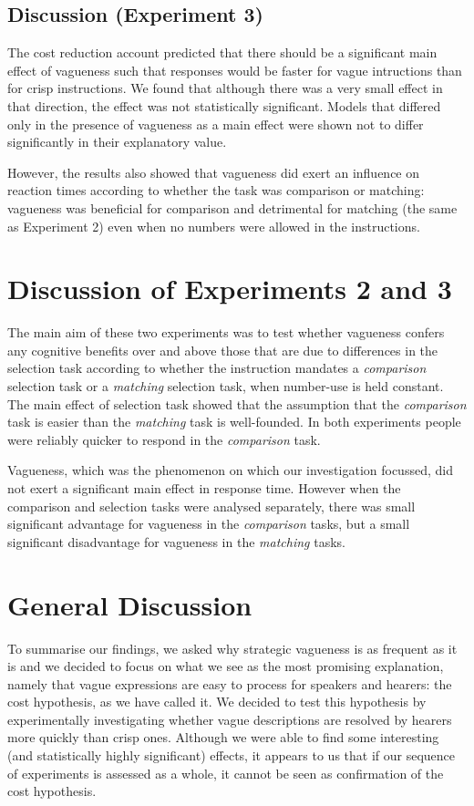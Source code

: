 \documentclass[ %
  graybox       %
 ,envcountchap  %
 ,sectrefs      %
]{svmono}
\begin{document}
\subsection{Discussion (Experiment 3)}

The cost reduction account predicted that there should be a significant main effect of vagueness such that responses would be faster for vague intructions than for crisp instructions. We found that although there was a very small effect in that direction, the effect was not statistically significant. Models that differed only in the presence of vagueness as a main effect were shown not to differ significantly in their explanatory value.

However, the results also showed that vagueness did exert an influence on reaction times according to whether the task was comparison or matching: vagueness was beneficial for comparison and detrimental for matching (the same as Experiment 2) even when no numbers were allowed in the instructions.

\section{Discussion of Experiments 2 and 3}
The main aim of these two experiments was to test whether vagueness confers any cognitive benefits over and above those that are due to differences in the selection task according to whether the instruction mandates a \emph{comparison} selection task or a \emph{matching} selection task, when number-use is held constant. The main effect of selection task showed that the assumption that the \emph{comparison} task is easier than the \emph{matching} task is well-founded. In both experiments people were reliably quicker to respond in the \emph{comparison} task.

Vagueness, which was the phenomenon on which our investigation focussed, did not exert a significant main effect in response time. However when the comparison and selection tasks were analysed separately, there was small significant advantage for vagueness in the \emph{comparison} tasks, but a small significant disadvantage for vagueness in the \emph{matching} tasks.

\section{General Discussion}
To summarise our findings, we asked why strategic vagueness is as frequent as it is and we decided to focus on what we see as the most promising explanation, namely that vague expressions are easy to process for speakers and hearers: the cost hypothesis, as we have called it. We decided to test this hypothesis by experimentally investigating whether vague descriptions are resolved by hearers more quickly than crisp ones. Although we were able to find some interesting (and statistically highly significant) effects, it appears to us that if our sequence of experiments is assessed as a whole, it cannot be seen as confirmation of the cost hypothesis.
\end{document}
